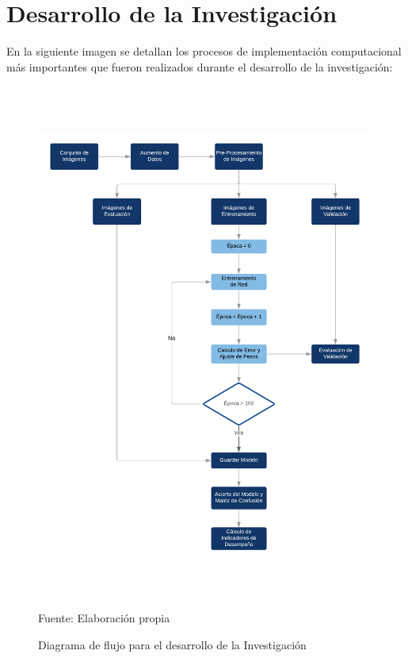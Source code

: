 \chapter{Desarrollo de la Investigación}
\setcounter{page}{71}
\renewcommand{\baselinestretch}{1.2} %

En la siguiente imagen se detallan los procesos de implementación computacional más importantes que fueron realizados durante el desarrollo de la investigación:

\begin{figure}[H]
	\begin{center}
	\includegraphics[width=1\textwidth,height=17cm]{images/summaryflowchart}
	\end{center}
	\vspace{1.5em}
	\begin{center}
	\caption{\small{Diagrama de flujo para el desarrollo de la Investigación}}
	\vskip -0.25cm
	{\small{Fuente: Elaboración propia}}
	\end{center}
	
\end{figure}


